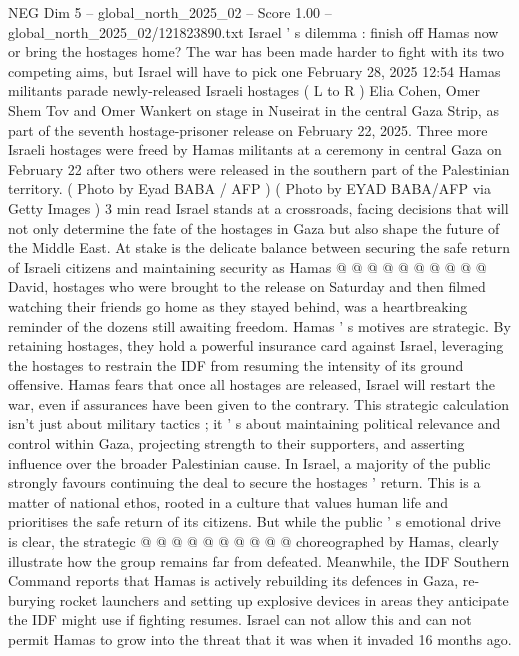 \begin{textsample}{NEG Dim 5 – global\_north\_2025\_02 – Score 1.00 – global\_north\_2025\_02/121823890.txt}  \label{ex:f5_neg_248}
Israel ' s dilemma : finish off Hamas now or bring the hostages home?
The war has been made harder to fight with its two competing aims, but Israel will have to pick one February 28, 2025 12:54 Hamas militants parade newly-released Israeli hostages ( L to R ) Elia Cohen, Omer Shem Tov and Omer Wankert on stage in Nuseirat in the central Gaza Strip, as part of the seventh hostage-prisoner release on February 22, 2025.
Three more Israeli hostages were freed by Hamas militants at a ceremony in central Gaza on February 22 after two others were released in the southern part of the Palestinian territory. ( Photo by Eyad BABA / AFP ) ( Photo by EYAD BABA/AFP via Getty Images ) 3 min read Israel stands at a crossroads, facing decisions that will not only determine the fate of the hostages in Gaza but also shape the future of the Middle East.
At stake is the delicate balance between securing the safe return of Israeli citizens and maintaining security as Hamas @ @ @ @ @ @ @ @ @ @ David, hostages who were brought to the release on Saturday and then filmed watching their friends go home as they stayed behind, was a heartbreaking reminder of the dozens still awaiting freedom.
Hamas ' s motives are strategic.
By retaining hostages, they hold a powerful insurance card against Israel, leveraging the hostages to restrain the IDF from resuming the intensity of its ground offensive.
Hamas fears that once all hostages are released, Israel will restart the war, even if assurances have been given to the contrary.
This strategic calculation isn't just about military tactics ; it ' s about maintaining political relevance and control within Gaza, projecting strength to their supporters, and asserting influence over the broader Palestinian cause.
In Israel, a majority of the public strongly favours continuing the deal to secure the hostages ' return.
This is a matter of national ethos, rooted in a culture that values human life and prioritises the safe return of its citizens.
But while the public ' s emotional drive is clear, the strategic @ @ @ @ @ @ @ @ @ @ choreographed by Hamas, clearly illustrate how the group remains far from defeated.
Meanwhile, the IDF Southern Command reports that Hamas is actively rebuilding its defences in Gaza, re-burying rocket launchers and setting up explosive devices in areas they anticipate the IDF might use if fighting resumes.
Israel can not allow this and can not permit Hamas to grow into the threat that it was when it invaded 16 months ago.

\end{textsample}
